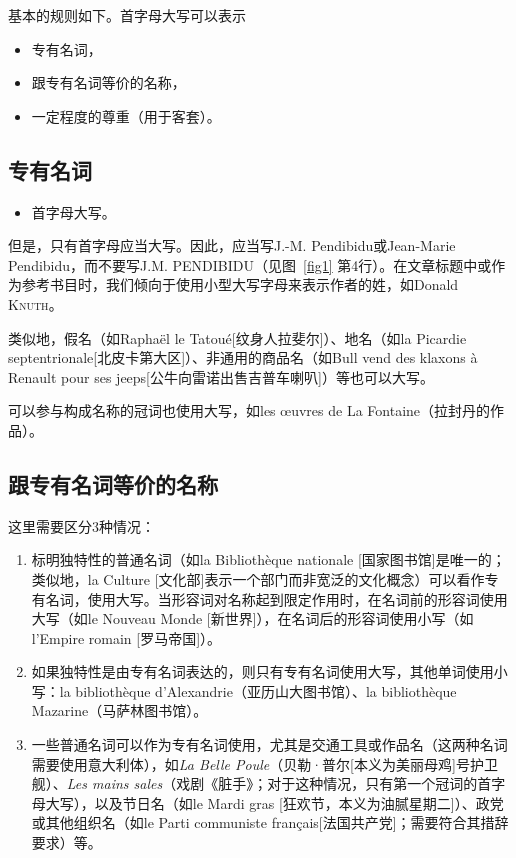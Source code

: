基本的规则如下。首字母大写可以表示

\begin{itemize}
    \item 专有名词，
    \item 跟专有名词等价的名称，
    \item 一定程度的尊重（用于客套）。
\end{itemize}

\subsection{专有名词}

\begin{itemize}
    \item 首字母大写。
\end{itemize}

但是，只有首字母应当大写。因此，应当写J.-M. Pendibidu或Jean-Marie Pendibidu，而不要写J.M. PENDIBIDU（见图~\ref{fig1} 第4行）。在文章标题中或作为参考书目时，我们倾向于使用小型大写字母来表示作者的姓，如Donald \textsc{Knuth}。

类似地，假名（如Raphaël le Tatoué[纹身人拉斐尔]）、地名（如la Picardie septentrionale[北皮卡第大区]）、非通用的商品名（如Bull vend des klaxons à Renault pour ses jeeps[公牛向雷诺出售吉普车喇叭]）等也可以大写。

可以参与构成名称的冠词也使用大写，如les œuvres de La Fontaine（拉封丹的作品）。

\subsection{跟专有名词等价的名称}

这里需要区分3种情况：

\begin{enumerate}
    \item 标明独特性的普通名词（如la Bibliothèque nationale [国家图书馆]是唯一的；类似地，la Culture [文化部]表示一个部门而非宽泛的文化概念）可以看作专有名词，使用大写。当形容词对名称起到限定作用时，在名词前的形容词使用大写（如le Nouveau Monde [新世界]），在名词后的形容词使用小写（如l'Empire romain [罗马帝国]）。
    \item 如果独特性是由专有名词表达的，则只有专有名词使用大写，其他单词使用小写：la bibliothèque d'Alexandrie（亚历山大图书馆）、la bibliothèque Mazarine（马萨林图书馆）。
    \item 一些普通名词可以作为专有名词使用，尤其是交通工具或作品名（这两种名词需要使用意大利体），如\emph{La Belle Poule}（贝勒·普尔[本义为美丽母鸡]号护卫舰）、\emph{Les mains sales}（戏剧《脏手》；对于这种情况，只有第一个冠词的首字母大写），以及节日名（如le Mardi gras [狂欢节，本义为油腻星期二]）、政党或其他组织名（如le Parti communiste français[法国共产党]；需要符合其措辞要求）等。
\end{enumerate}


